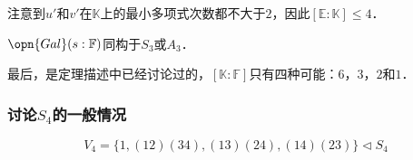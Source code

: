 注意到$u'$和$v'$在$\mathbb{K}$上的最小多项式次数都不大于$2$，因此$[\mathbb{E}:\mathbb{K}]\leq 4$．

$\opn{Gal}(s:\mathbb{F})$同构于$S_3$或$A_3$．

最后，是定理描述中已经讨论过的，$[\mathbb{K}:\mathbb{F}]$只有四种可能：$6$，$3$，$2$和$1$．

\subsubsection{讨论$S_4$的一般情况}

\begin{equation}
V_4=\{1, (1 2)(3 4), (13)(24), (14)(23)\}\vartriangleleft S_4
\end{equation}










